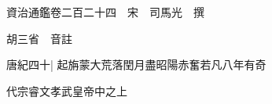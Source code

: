 






























































資治通鑑卷二百二十四　宋　司馬光　撰

胡三省　音註

唐紀四十|{
	起旃蒙大荒落閏月盡昭陽赤奮若凡八年有奇}


代宗睿文孝武皇帝中之上

